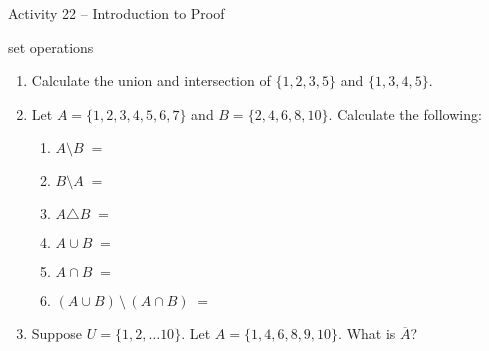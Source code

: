 \documentclass{amsart}
\begin{document}
\thispagestyle{empty}

\centerline{\Large Activity 22 -- Introduction to Proof}
\centerline{\large set operations}

\bigskip
\Large


\begin{enumerate}

\item Calculate the union and intersection of $\{1, 2, 3, 5 \}$ and $\{ 1, 3, 4, 5 \}$.

\vfill

\item Let $A = \{1, 2, 3, 4, 5, 6, 7 \}$ and $B = \{2, 4, 6, 8, 10\}$.  Calculate the following:

\vspace{.2in}

\begin{enumerate}
\item $A \setminus B \; = $

\vspace{.2in}

\item $B \setminus A \; = $

\vspace{.2in}

\item $A \triangle B \; = $

\vspace{.2in}

\item $A \cup B \; = $

\vspace{.2in}

\item $A \cap B \; = $

\vspace{.2in}

\item $(A \cup B) \, \setminus \, (A \cap B) \; = $

\vspace{.7in}

\end{enumerate}

\item Suppose $U = \{1, 2, \ldots 10 \}$.  Let $A = \{1, 4, 6, 8, 9, 10 \}$.  What is $\overline{A}$?

\vfill

\newpage


\end{enumerate}
\end{document}
